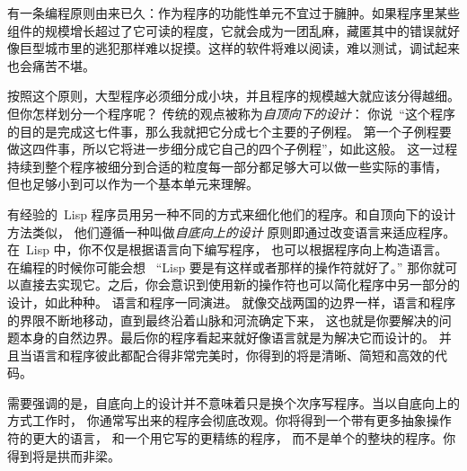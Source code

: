 有一条编程原则由来已久：作为程序的功能性单元不宜过于臃肿。如果程序里某些组件的规模增长超过了它可读的程度，它就会成为一团乱麻，藏匿其中的错误就好像巨型城市里的逃犯那样难以捉摸。这样的软件将难以阅读，难以测试，调试起来也会痛苦不堪。

按照这个原则，大型程序必须细分成小块，并且程序的规模越大就应该分得越细。
但你怎样划分一个程序呢？
传统的观点被称为\emph{自顶向下的设计}：
你说~``这个程序的目的是完成这七件事，那么我就把它分成七个主要的子例程。
第一个子例程要做这四件事，所以它将进一步细分成它自己的四个子例程''，如此这般。
这一过程持续到整个程序被细分到合适的粒度\pozhehao{}每一部分都足够大可以做一些实际的事情，
但也足够小到可以作为一个基本单元来理解。

有经验的~Lisp 程序员用另一种不同的方式来细化他们的程序。和自顶向下的设计方法类似，
他们遵循一种叫做\emph{自底向上的设计}
原则\pozhehao{}即通过改变语言来适应程序。在~Lisp 中，你不仅是根据语言向下编写程序，
也可以根据程序向上构造语言。在编程的时候你可能会想
~``Lisp 要是有这样或者那样的操作符就好了。''
那你就可以直接去实现它。之后，你会意识到使用新的操作符也可以简化程序中另一部分的设计，如此种种。
语言和程序一同演进。
就像交战两国的边界一样，语言和程序的界限不断地移动，直到最终沿着山脉和河流确定下来，
这也就是你要解决的问题本身的自然边界。最后你的程序看起来就好像语言就是为解决它而设计的。
并且当语言和程序彼此都配合得非常完美时，你得到的将是清晰、简短和高效的代码。

需要强调的是，自底向上的设计并不意味着只是换个次序写程序。当以自底向上的方式工作时，
你通常写出来的程序会彻底改观。你将得到一个带有更多抽象操作符的更大的语言，
和一个用它写的更精练的程序，
而不是单个的整块的程序。你得到将是拱而非梁。

